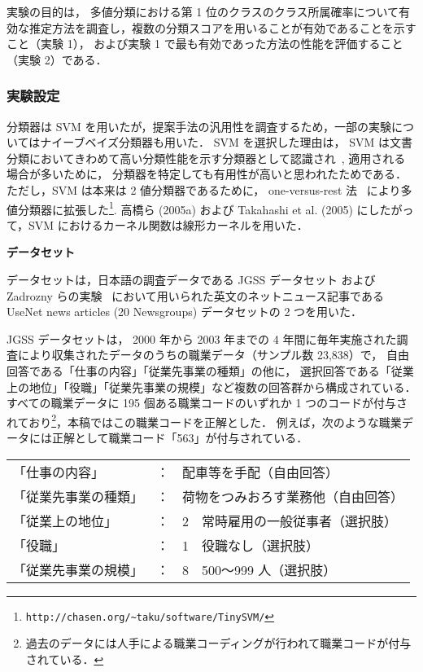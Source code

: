 \documentclass[japanese]{jnlp_1.4}
\begin{document}
実験の目的は，
多値分類における第 1 位のクラスのクラス所属確率について有効な推定方法を調査し，複数の分類スコアを用いることが有効であることを示すこと（実験 1），
および実験 1 で最も有効であった方法の性能を評価すること（実験 2）である．

\subsubsection{実験設定} 

分類器は SVM を用いたが，提案手法の汎用性を調査するため，一部の実験についてはナイーブベイズ分類器も用いた．
SVM を選択した理由は，
SVM は文書分類においてきわめて高い分類性能を示す分類器として認識され~\cite{Joachims98,Dumais_et_al98,Taira00,Sebastiani02}, 
適用される場合が多いために，
分類器を特定しても有用性が高いと思われたためである．
ただし，SVM は本来は 2 値分類器であるために，
one-versus-rest 法~\cite{kressel99} により多値分類器に拡張した\footnote{
	\texttt{http://chasen.org/\textasciitilde taku/software/TinySVM/}
}. 
高橋ら (2005a) および Takahashi et al. (2005) にしたがって，SVM におけるカーネル関数は線形カーネルを用いた．
\vspace{1\baselineskip}\par
\noindent
{\bf データセット} 

データセットは，日本語の調査データである JGSS データセット
\pagebreak
および Zadrozny らの実験~\cite{Zadrozny02} において用いられた英文のネットニュース記事である UseNet news articles (20 Newsgroups) データセットの 2 つを用いた．

JGSS データセットは，
2000 年から 2003 年までの 4 年間に毎年実施された調査により収集されたデータのうちの職業データ（サンプル数 23,838）で，
自由回答である「仕事の内容」「従業先事業の種類」の他に，
選択回答である「従業上の地位」「役職」「従業先事業の規模」など複数の回答群から構成されている． すべての職業データに 195 個ある職業コードのいずれか 1 つのコードが付与されており\footnote{
	過去のデータには人手による職業コーディングが行われて職業コードが付与されている．
}，本稿ではこの職業コードを正解とした．
例えば，次のような職業データには正解として職業コード「563」が付与されている．
    \vspace{0.5\baselineskip}\par
\begin{tabular}{lll}
「仕事の内容」&：&配車等を手配（自由回答）\\
「従業先事業の種類」&：&荷物をつみおろす業務他（自由回答）\\  
「従業上の地位」&：&2　常時雇用の一般従事者（選択肢）\\
「役職」&：&1　役職なし（選択肢）\\
「従業先事業の規模」&：&8　500〜999 人（選択肢）
\end{tabular}
    \vspace{0.5\baselineskip}
\end{document}
